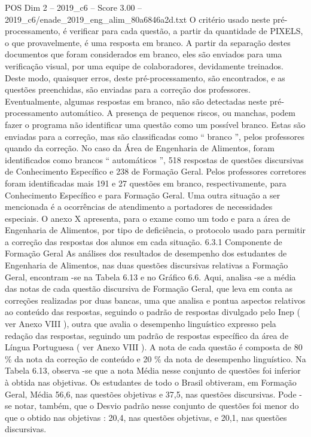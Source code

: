 \begin{textsample}{POS Dim 2 – 2019\_c6 – Score 3.00 – 2019\_c6/enade\_2019\_eng\_alim\_80a6846a2d.txt}
O critério usado neste pré-processamento, é verificar para cada questão, a partir da quantidade de PIXELS, o que provavelmente, é uma resposta em branco.
A partir da separação destes documentos que foram considerados em branco, eles são enviados para uma verificação visual, por uma equipe de colaboradores, devidamente treinados.
Deste modo, quaisquer erros, deste pré-processamento, são encontrados, e as questões preenchidas, são enviadas para a correção dos professores.
Eventualmente, algumas respostas em branco, não são detectadas neste pré-processamento automático.
A presença de pequenos riscos, ou manchas, podem fazer o programa não identificar uma questão como um possível branco.
Estas são enviadas para a correção, mas são classificadas como “ branco ”, pelos professores quando da correção.
No caso da Área de Engenharia de Alimentos, foram identificados como brancos “ automáticos ”, 518 respostas de questões discursivas de Conhecimento Específico e 238 de Formação Geral.
Pelos professores corretores foram identificadas mais 191 e 27 questões em branco, respectivamente, para Conhecimento Específico e para Formação Geral.
Uma outra situação a ser mencionada é a ocorrências de atendimento a portadores de necessidades especiais.
O anexo X apresenta, para o exame como um todo e para a área de Engenharia de Alimentos, por tipo de deficiência, o protocolo usado para permitir a correção das respostas dos alunos em cada situação. 6.3.1 Componente de Formação Geral As análises dos resultados de desempenho dos estudantes de Engenharia de Alimentos, nas duas questões discursivas relativas a Formação Geral, encontram -se na Tabela 6.13 e no Gráfico 6.6.
Aqui, analisa -se a média das notas de cada questão discursiva de Formação Geral, que leva em conta as correções realizadas por duas bancas, uma que analisa e pontua aspectos relativos ao conteúdo das respostas, seguindo o padrão de respostas divulgado pelo Inep ( ver Anexo VIII ), outra que avalia o desempenho linguístico expresso pela redação das respostas, seguindo um padrão de respostas específico da área de Língua Portuguesa ( ver Anexo VIII ).
A nota de cada questão é composta de 80 \% da nota da correção de conteúdo e 20 \% da nota de desempenho linguístico.
Na Tabela 6.13, observa -se que a nota Média nesse conjunto de questões foi inferior à obtida nas objetivas.
Os estudantes de todo o Brasil obtiveram, em Formação Geral, Média 56,6, nas questões objetivas e 37,5, nas questões discursivas.
Pode -se notar, também, que o Desvio padrão nesse conjunto de questões foi menor do que o obtido nas objetivas : 20,4, nas questões objetivas, e 20,1, nas questões discursivas.

\end{textsample}
